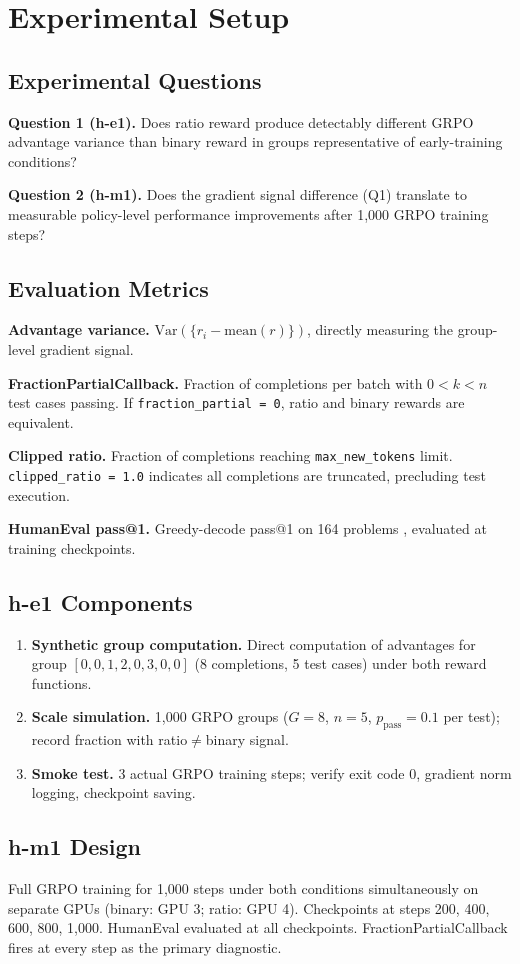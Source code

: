 \section{Experimental Setup}
\label{sec:setup}

\subsection{Experimental Questions}

\textbf{Question 1 (h-e1).} Does ratio reward produce detectably different GRPO advantage variance than binary reward in groups representative of early-training conditions?

\textbf{Question 2 (h-m1).} Does the gradient signal difference (Q1) translate to measurable policy-level performance improvements after 1,000 GRPO training steps?

\subsection{Evaluation Metrics}

\textbf{Advantage variance.} $\text{Var}(\{r_i - \text{mean}(r)\})$, directly measuring the group-level gradient signal.

\textbf{FractionPartialCallback.} Fraction of completions per batch with $0 < k < n$ test cases passing. If \texttt{fraction\_partial = 0}, ratio and binary rewards are equivalent.

\textbf{Clipped ratio.} Fraction of completions reaching \texttt{max\_new\_tokens} limit. \texttt{clipped\_ratio = 1.0} indicates all completions are truncated, precluding test execution.

\textbf{HumanEval pass@1.} Greedy-decode pass@1 on 164 problems \citep{chen2021humaneval}, evaluated at training checkpoints.

\subsection{h-e1 Components}

\begin{enumerate}
    \item \textbf{Synthetic group computation.} Direct computation of advantages for group $[0,0,1,2,0,3,0,0]$ (8 completions, 5 test cases) under both reward functions.
    \item \textbf{Scale simulation.} 1,000 GRPO groups ($G=8$, $n=5$, $p_{\text{pass}}=0.1$ per test); record fraction with ratio$\neq$binary signal.
    \item \textbf{Smoke test.} 3 actual GRPO training steps; verify exit code 0, gradient norm logging, checkpoint saving.
\end{enumerate}

\subsection{h-m1 Design}

Full GRPO training for 1,000 steps under both conditions simultaneously on separate GPUs (binary: GPU 3; ratio: GPU 4). Checkpoints at steps 200, 400, 600, 800, 1,000. HumanEval evaluated at all checkpoints. FractionPartialCallback fires at every step as the primary diagnostic.
